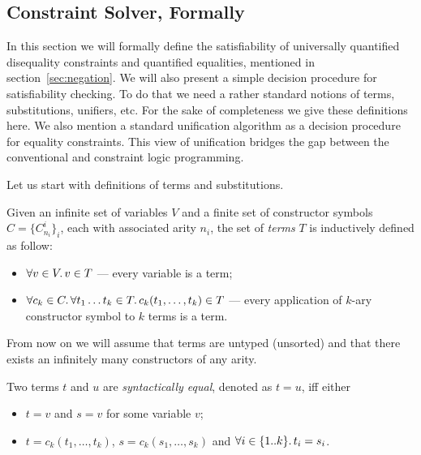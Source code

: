 \subsection{Constraint Solver, Formally}

\label{sec:ctr-solver}

In this section we will formally define 
the satisfiability of universally quantified 
disequality constraints and quantified equalities,
mentioned in section~\ref{sec:negation}.
We will also present a simple decision procedure 
for satisfiability checking.
To do that we need a rather standard notions of  
terms, substitutions, unifiers, etc. 
For the sake of completeness we give these definitions here.
We also mention a standard unification algorithm as a
decision procedure for equality constraints.
This view of unification bridges the gap
between the conventional and constraint logic programming. 

Let us start with definitions of terms and substitutions.

\begin{definition}
  Given an infinite set of variables $V$ 
  and a finite set of constructor symbols $C = \{C^i_{n_i}\}_i$,
  each with associated arity $n_i$,
  the set of \emph{terms} $T$ is inductively defined as follow:
  \begin{itemize}
    \item $\forall v \in V \ldotp v \in T$ --- every variable is a term;
    \item $\forall c_k \in C\ldotp \forall t_1 \dots t_k \in T \ldotp c_k(t_1, \dots, t_k) \in T$ --- 
       every application of $k$-ary constructor symbol to $k$ terms is a term.
  \end{itemize}
\end{definition}

From now on we will assume that terms are untyped (unsorted)
and that there exists an infinitely many constructors of any arity.

\begin{definition}
  Two terms $t$ and $u$ are \emph{syntactically equal},
  denoted as $t = u$, iff either 
  \begin{itemize}
    \item $t = v$ and $s = v$ for some variable $v$;
    \item $t = c_k(t_1, \dots, t_k)$, $s = c_k(s_1, \dots, s_k)$ and
          $\forall i \in \{1 .. k\}\ldotp t_i = s_i$.
  \end{itemize}
\end{definition}

